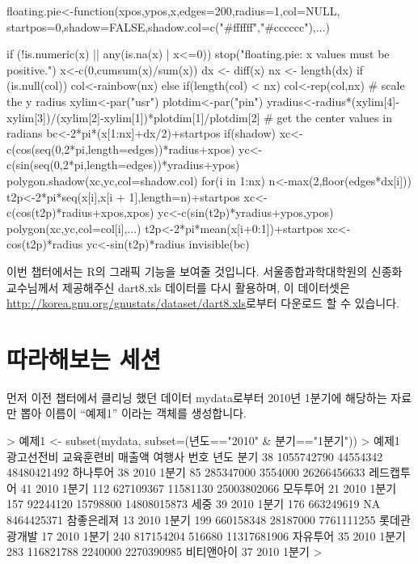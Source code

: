 floating.pie<-function(xpos,ypos,x,edges=200,radius=1,col=NULL,
 startpos=0,shadow=FALSE,shadow.col=c("#ffffff","#cccccc"),...) {

 if (!is.numeric(x) || any(is.na(x) | x<=0))
  stop("floating.pie: x values must be positive.")
 x<-c(0,cumsum(x)/sum(x))
 dx <- diff(x)
 nx <- length(dx)
 if (is.null(col)) col<-rainbow(nx)
 else if(length(col) < nx) col<-rep(col,nx)
 # scale the y radius
 xylim<-par("usr")
 plotdim<-par("pin")
 yradius<-radius*(xylim[4]-xylim[3])/(xylim[2]-xylim[1])*plotdim[1]/plotdim[2]
 # get the center values in radians
 bc<-2*pi*(x[1:nx]+dx/2)+startpos
 if(shadow) {
  xc<-c(cos(seq(0,2*pi,length=edges))*radius+xpos)
  yc<-c(sin(seq(0,2*pi,length=edges))*yradius+ypos)
  polygon.shadow(xc,yc,col=shadow.col)
 }
 for(i in 1:nx) {
  n<-max(2,floor(edges*dx[i]))
  t2p<-2*pi*seq(x[i],x[i + 1],length=n)+startpos
  xc<-c(cos(t2p)*radius+xpos,xpos)
  yc<-c(sin(t2p)*yradius+ypos,ypos)
  polygon(xc,yc,col=col[i],...)
  t2p<-2*pi*mean(x[i+0:1])+startpos
  xc<-cos(t2p)*radius
  yc<-sin(t2p)*radius
 }
 invisible(bc)
}























이번 챕터에서는 R의 그래픽 기능을 보여줄 것입니다.
서울종합과학대학원의 신종화 교수님께서 제공해주신 dart8.xls 데이터를 다시 활용하며, 이 데이터셋은 \href{http://korea.gnu.org/gnustats/dataset/dart8.xls}{http://korea.gnu.org/gnustats/dataset/dart8.xls}로부터 다운로드 할 수 있습니다.

\section{따라해보는 세션}
먼저 이전 챕터에서 클리닝 했던 데이터 mydata로부터 2010년 1분기에 해당하는 자료만 뽑아 이름이 ``예제1'' 이라는 객체를 생성합니다.

\begin{Schunk}
\begin{Soutput}	
> 예제1 <- subset(mydata, subset=(년도=="2010" & 분기=="1분기"))
> 예제1 
    광고선전비 교육훈련비      매출액       여행사 번호 년도  분기
38  1055742790   44554342 48480421492     하나투어   38 2010 1분기
85   285347000    3554000 26266456633   레드캡투어   41 2010 1분기
112  627109367   11581130 25003802066     모두투어   21 2010 1분기
157   92244120   15798800 14808015873         세중   39 2010 1분기
176  663249619         NA  8464425371   참좋은레져   13 2010 1분기
199  660158348   28187000  7761111255 롯데관광개발   17 2010 1분기
240  817154204     516680 11317681906     자유투어   35 2010 1분기
283  116821788    2240000  2270390985   비티앤아이   37 2010 1분기
>
\end{Soutput}
\end{Schunk}

